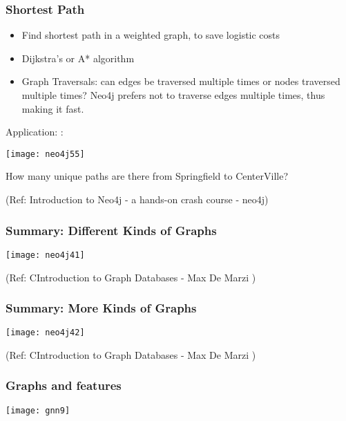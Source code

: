 \begin{frame}\frametitle{Shortest Path}

\begin{itemize}
\item Find shortest path in a weighted graph, to save logistic costs
\item Dijkstra's or A* algorithm
\item Graph Traversals: can edges be traversed multiple times or nodes traversed multiple times? Neo4j prefers not to traverse edges multiple times, thus making it fast.
\end{itemize}

Application: :
\begin{center}
\texttt{[image: neo4j55]}
\end{center}	

How many unique paths are there from Springfield to CenterVille?

{\tiny (Ref: Introduction to Neo4j - a hands-on crash course - neo4j)}
\end{frame}

\begin{frame}\frametitle{Summary: Different Kinds of Graphs}

\begin{center}
\texttt{[image: neo4j41]}
\end{center}
 

{\tiny (Ref: CIntroduction to Graph Databases - Max De Marzi )}
\end{frame}

\begin{frame}\frametitle{Summary: More Kinds of Graphs}

\begin{center}
\texttt{[image: neo4j42]}
\end{center}
 

{\tiny (Ref: CIntroduction to Graph Databases - Max De Marzi )}
\end{frame}


\begin{frame}[fragile]\frametitle{Graphs and features}

\begin{center}
\texttt{[image: gnn9]}
\end{center}	  

\end{frame}

